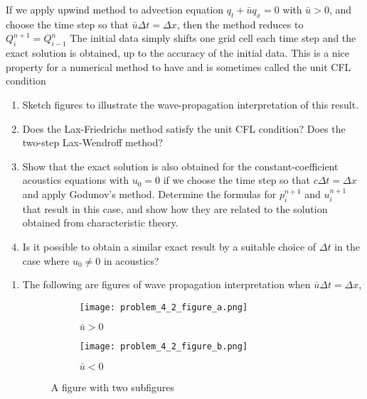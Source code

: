 \documentclass[11pt]{article}
\begin{document}
\begin{enumerate}
			If we apply upwind method to advection equation $q_t+\bar{u}q_x=0$ with $\bar{u}>0$, and choose the time step so that $\bar{u}\Delta t=\Delta x$, then the method reduces to 
			$
			Q_i^{n+1}=Q_{i-1}^n
			$
			The initial data simply shifts one grid cell each time step and the exact solution is obtained, up to the accuracy of the initial data. This is a nice property for a numerical method to have and is sometimes called the unit CFL condition
			
			\begin{enumerate}
			
				\item Sketch figures to illustrate the wave-propagation interpretation of this result.
				\item Does the Lax-Friedrichs method satisfy the unit CFL condition? Does the two-step Lax-Wendroff method?
				\item Show that the exact solution is also obtained for the constant-coefficient acoustics equations with $u_0=0$ if we choose the time step so that $c\Delta t=\Delta x$ and apply Godunov's method. Determine the formulas for $p_i^{n+1}$ and $u_i^{n+1}$ that result in this case, and show how they are related to the solution obtained from characteristic theory.
				\item Is it possible to obtain a similar exact result by a suitable choice of $\Delta t$ in the case where $u_0\neq 0$ in acoustics?			
			
			\end{enumerate}      
        	\begin{enumerate}
				\item
					The following are figures of wave propagation interpretation when $\bar{u}\Delta t=\Delta x$,
					\begin{figure}[H]
						\centering
						\begin{subfigure}{.5\textwidth}
  							\centering
  							\texttt{[image: problem\_4\_2\_figure\_a.png]}
  							\caption{$\bar{u}>0$}
  							\label{fig:sub1}
						\end{subfigure}%
						\begin{subfigure}{.5\textwidth}
  							\centering
  							\texttt{[image: problem\_4\_2\_figure\_b.png]}
  							\caption{$\bar{u}<0$}
  							\label{fig:sub2}
						\end{subfigure}
						\caption{A figure with two subfigures}
					\label{fig:test}
					\end{figure}
					

\end{enumerate}
\end{enumerate}
\end{document}
